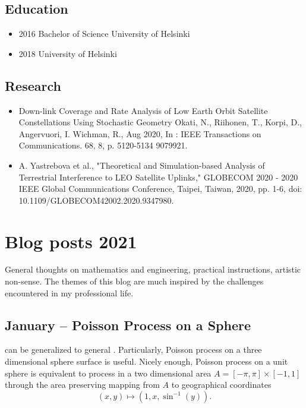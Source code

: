 \documentclass{article}
\begin{document}
        \subsection{Education}
        \begin{itemize}
        \item 2016 Bachelor of Science University of Helsinki\\
        \item 2018  University of Helsinki
        \end{itemize}
        \subsection{Research}

        \begin{itemize}
        \item Down-link Coverage and Rate Analysis of Low Earth Orbit Satellite Constellations Using Stochastic Geometry
          Okati, N., Riihonen, T., Korpi, D., Angervuori, I. Wichman, R., Aug 2020, In : IEEE Transactions on Communications. 68, 8, p. 5120-5134 9079921.\\
        \item A. Yastrebova et al., "Theoretical and Simulation-based Analysis of Terrestrial Interference to LEO Satellite Uplinks," GLOBECOM 2020 - 2020 IEEE Global Communications Conference, Taipei, Taiwan, 2020, pp. 1-6, doi: 10.1109/GLOBECOM42002.2020.9347980.
        \end{itemize}


        \section{Blog posts 2021}
        General thoughts on mathematics and engineering, practical instructions, artistic non-sense. The themes of this blog are much inspired by the challenges encountered in my professional life.

        \subsection{January – Poisson Process on a Sphere}
         can be generalized to general . Particularly, Poisson process on a three dimensional sphere surface is useful. Nicely enough, Poisson process on a unit sphere is equivalent to process in a two dimensional area $ A = [-\pi,\pi] \times [-1,1]$ through the area preserving mapping from $A$ to geographical coordinates
        \begin{equation}
          (x,y) \mapsto (1,x,\sin^{-1}(y)) \nonumber.
        \end{equation}
\end{document}
